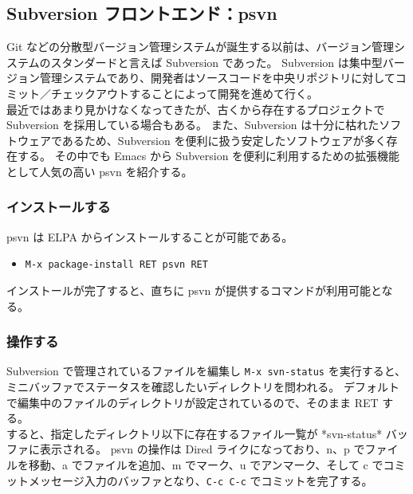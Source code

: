 \subsection{Subversion フロントエンド：psvn}
Git などの分散型バージョン管理システムが誕生する以前は、バージョン管理システムのスタンダードと言えば Subversion であった。
Subversion は集中型バージョン管理システムであり、開発者はソースコードを中央リポジトリに対してコミット／チェックアウトすることによって開発を進めて行く。\\

最近ではあまり見かけなくなってきたが、古くから存在するプロジェクトで Subversion を採用している場合もある。
また、Subversion は十分に枯れたソフトウェアであるため、Subversion を便利に扱う安定したソフトウェアが多く存在する。
その中でも Emacs から Subversion を便利に利用するための拡張機能として人気の高い psvn を紹介する。
\subsubsection{インストールする}
psvn は ELPA からインストールすることが可能である。
\begin{itemize}\setlength{\leftskip}{-1.00zw}%
\item[] \texttt{M-x package-install RET psvn RET}
\end{itemize}
インストールが完了すると、直ちに psvn が提供するコマンドが利用可能となる。
\subsubsection{操作する}
Subversion で管理されているファイルを編集し \texttt{M-x svn-status} を実行すると、ミニバッファでステータスを確認したいディレクトリを問われる。
デフォルトで編集中のファイルのディレクトリが設定されているので、そのまま RET する。\\

すると、指定したディレクトリ以下に存在するファイル一覧が *svn-status* バッファに表示される。
psvn の操作は Dired ライクになっており、n、p でファイルを移動、a でファイルを追加、m でマーク、u でアンマーク、そして c でコミットメッセージ入力のバッファとなり、\texttt{C-c C-c} でコミットを完了する。\\


